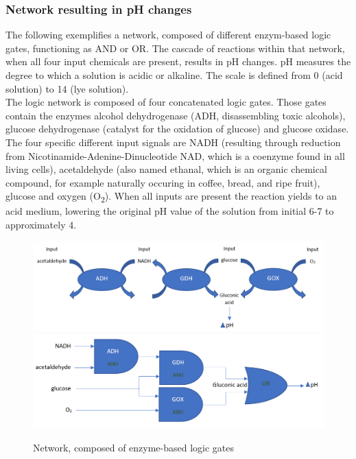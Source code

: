\documentclass[runningheads]{llncs}
\begin{document}
		\subsubsection{Network resulting in pH changes} The following exemplifies a network, composed of different enzym-based logic gates, functioning as AND or OR. The cascade of reactions within that network, when all four input chemicals are present, results in pH changes. pH measures the degree to which a solution is acidic or alkaline. The scale is defined from 0 (acid solution) to 14 (lye solution).\\
		The logic network is composed of four concatenated logic gates. Those gates contain the enzymes alcohol dehydrogenase (ADH, disassembling toxic alcohols), glucose dehydrogenase (catalyst for the oxidation of glucose) and glucose oxidase. The four specific different input signals are NADH (resulting through reduction from Nicotinamide-Adenine-Dinucleotide NAD, which is a coenzyme found in all living cells),  acetaldehyde (also named ethanal, which is an organic chemical compound, for example naturally occuring in coffee, bread, and ripe fruit), glucose and oxygen (O\textsubscript{2}).
	 	When all inputs are present the reaction yields to an acid medium, lowering the original pH value of the solution from initial 6-7 to approximately 4. \cite{original}\cite{chemie}


		
		\begin{figure}
			\centering \includegraphics[scale= 0.35]{pics/network1.png}
			\includegraphics[scale = 0.39]{pics/network2.png} \caption{Network, composed of enzyme-based logic gates}
		\end{figure}
\end{document}
